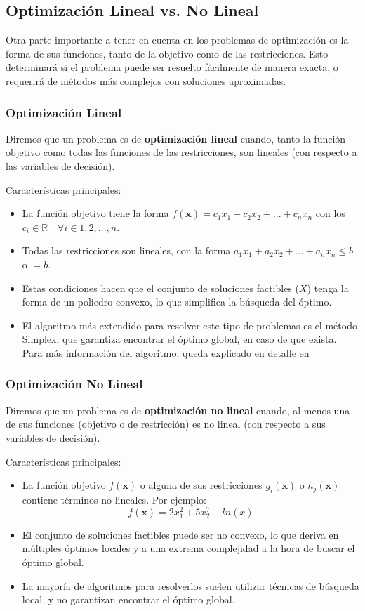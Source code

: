\documentclass[12pt,a4paper]{book}
\begin{document}
\subsection{Optimización Lineal vs. No Lineal}

Otra parte importante a tener en cuenta en los problemas de optimización es la forma de sus funciones, tanto de la objetivo como de las restricciones. Esto determinará si el problema puede ser resuelto fácilmente de manera exacta, o requerirá de métodos más complejos con soluciones aproximadas.

\subsubsection{Optimización Lineal}
Diremos que un problema es de \textbf{optimización lineal} cuando, tanto la función objetivo como todas las funciones de las restricciones, son lineales (con respecto a las variables de decisión). 

Características principales:
\begin{itemize}
    \item La función objetivo tiene la forma $f(\mathbf{x})=c_1x_1+c_2x_2+...+c_nx_n$ con los $c_i \in \mathbb{R} \quad \forall i \in 1,2,...,n$.
    \item Todas las restricciones son lineales, con la forma $a_1x_1+a_2x_2+...+a_nx_n\leq b$ o $=b$.
    \item Estas condiciones hacen que el conjunto de soluciones factibles ($X$) tenga la forma de un poliedro convexo, lo que simplifica la búsqueda del óptimo.
    \item El algoritmo más extendido para resolver este tipo de problemas es el método Simplex, que garantiza encontrar el óptimo global, en caso de que exista. Para más información del algoritmo, queda explicado en detalle en \cite{Dantzig1951}
\end{itemize}


\subsubsection{Optimización No Lineal}
Diremos que un problema es de \textbf{optimización no lineal} cuando, al menos una de sus funciones (objetivo o de restricción) es no lineal (con respecto a sus variables de decisión). 

Características principales:
\begin{itemize}
    \item La función objetivo $f(\mathbf{x})$ o alguna de sus restricciones $g_i(\mathbf{x})$ o $h_j(\mathbf{x})$ contiene términos no lineales. Por ejemplo:
    $$f(\mathbf{x})=2x_1^2+5x_2^7-ln(x)$$
    \item El conjunto de soluciones factibles puede ser no convexo, lo que deriva en múltiples óptimos locales y a una extrema complejidad a la hora de buscar el óptimo global.
    \item La mayoría de algoritmos para resolverlos suelen utilizar técnicas de búsqueda local, y no garantizan encontrar el óptimo global.
\end{itemize}
\end{document}
